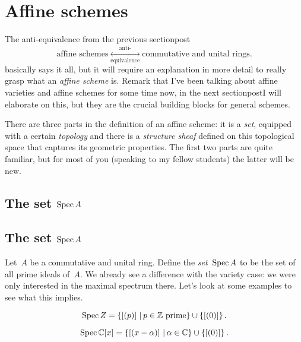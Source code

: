 \section{Affine schemes}
The anti-equivalence from the previous \iftex section\fi\ifblog post\fi
\begin{equation}
  \text{affine schemes} \underset{\text{equivalence}}{\overset{\text{anti-}}{\longleftrightarrow}} \text{commutative and unital rings}.
  \label{equation:schemes-anti-equivalence-2}
\end{equation}
basically says it all, but it will require an explanation in more detail to really grasp what an \emph{affine scheme} is. Remark that I've been talking about affine varieties and affine schemes for some time now, in the next \iftex section\fi\ifblog post\fi I will elaborate on this, but they are the crucial building blocks for general schemes.

There are three parts in the definition of an affine scheme: it is a \emph{set}, equipped with a certain \emph{topology} and there is a \emph{structure sheaf} defined on this topological space that captures its geometric properties. The first two parts are quite familiar, but for most of you (speaking to my fellow students) the latter will be new.

\iftex
\subsection[The set Spec A]{The set $\operatorname{Spec} A$}
\fi
\ifblog
\subsection{The set $\operatorname{Spec} A$}
\fi
Let~$A$ be a commutative and unital ring. Define the \emph{set~$\operatorname{Spec} A$} to be the set of all prime ideals of~$A$. We already see a difference with the variety case: we were only interested in the maximal spectrum there. Let's look at some examples to see what this implies.

\begin{example}
  \begin{equation}
    \operatorname{Spec} Z=\left\{ \left[ (p) \right]\,|\,\text{$p\in\mathbb{Z}$ prime} \right\}\cup\left\{ [(0)] \right\}.
  \end{equation}
\end{example}

\begin{example}
  \begin{equation}
    \operatorname{Spec}\mathbb{C}[x]=\left\{ \left[ (x-\alpha) \right]\,|\,\alpha\in\mathbb{C} \right\}\cup\left\{ [(0)] \right\}.
  \end{equation}
\end{example}

